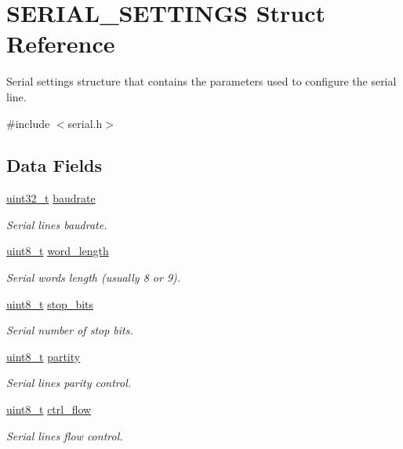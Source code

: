 \hypertarget{struct_s_e_r_i_a_l___s_e_t_t_i_n_g_s}{}\section{S\+E\+R\+I\+A\+L\+\_\+\+S\+E\+T\+T\+I\+N\+GS Struct Reference}
\label{struct_s_e_r_i_a_l___s_e_t_t_i_n_g_s}


Serial settings structure that contains the parameters used to configure the serial line.  




{\ttfamily \#include $<$serial.\+h$>$}

\subsection*{Data Fields}
\begin{DoxyCompactItemize}
\item 
\hyperlink{stdint_8h_a324c5d28c0d82f502a234ab99efac87a}{uint32\+\_\+t} \hyperlink{struct_s_e_r_i_a_l___s_e_t_t_i_n_g_s_ac4f06ea26ed6bd7ae83b92d64ac10b78}{baudrate}
\begin{DoxyCompactList}\small\item\em Serial line\textquotesingle{}s baudrate. \end{DoxyCompactList}\item 
\hyperlink{stdint_8h_aba7bc1797add20fe3efdf37ced1182c5}{uint8\+\_\+t} \hyperlink{struct_s_e_r_i_a_l___s_e_t_t_i_n_g_s_ae9ff0fba282a81e6b05a1082ab54e14d}{word\+\_\+length}
\begin{DoxyCompactList}\small\item\em Serial word\textquotesingle{}s length (usually 8 or 9). \end{DoxyCompactList}\item 
\hyperlink{stdint_8h_aba7bc1797add20fe3efdf37ced1182c5}{uint8\+\_\+t} \hyperlink{struct_s_e_r_i_a_l___s_e_t_t_i_n_g_s_ae847d8b7e1095e0ae8d6eb1e4a281585}{stop\+\_\+bits}
\begin{DoxyCompactList}\small\item\em Serial number of stop bits. \end{DoxyCompactList}\item 
\hyperlink{stdint_8h_aba7bc1797add20fe3efdf37ced1182c5}{uint8\+\_\+t} \hyperlink{struct_s_e_r_i_a_l___s_e_t_t_i_n_g_s_a57fc780fe7a58343cb0513fd873e95fb}{partity}
\begin{DoxyCompactList}\small\item\em Serial line\textquotesingle{}s parity control. \end{DoxyCompactList}\item 
\hyperlink{stdint_8h_aba7bc1797add20fe3efdf37ced1182c5}{uint8\+\_\+t} \hyperlink{struct_s_e_r_i_a_l___s_e_t_t_i_n_g_s_a6f2a9d6a71d9ca705cf561f08e4e222c}{ctrl\+\_\+flow}
\begin{DoxyCompactList}\small\item\em Serial line\textquotesingle{}s flow control. \end{DoxyCompactList}\end{DoxyCompactItemize}


